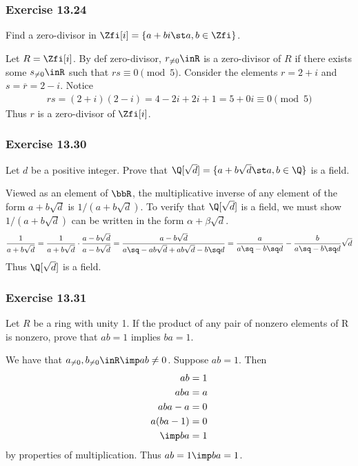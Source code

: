 \documentclass{article}
\begin{document}
\subsubsection*{Exercise 13.24}
Find a zero-divisor in \( \Zfi[i] = \{a+bi\st a,b\in\Zfi\} \).

\begin{solution} %
  Let \( R = \Zfi[i] \). By def zero-divisor, \( r_{\neq 0}\inR \) is a zero-divisor of \( R \) if there exists some \( s_{\neq 0}\inR \) such that \( rs \equiv 0 \pmod 5 \). Consider the elements \( r = 2+i \) and \( s = \overline{r} = 2-i \). Notice
  \begin{align*}
    rs = (2+i)(2-i) = 4 -2i + 2i + 1 = 5 + 0i \equiv 0 \pmod 5
  \end{align*}
  Thus \( r \) is a zero-divisor of \( \Zfi[i] \).
\end{solution}

\subsubsection*{Exercise 13.30}
Let \( d \) be a positive integer. Prove that \( \Q[\sqrt d] = \{a + b\sqrt d\st a,b\in\Q\}\) is a field.

\begin{solution} %
  Viewed as an element of \( \bbR \), the multiplicative inverse of any element of the form \( a+b\sqrt d \) is \( 1/(a+b\sqrt d) \). To verify that \( \Q[\sqrt d] \) is a field, we must show \( 1/(a+b\sqrt d) \) can be written in the form \( \alpha+\beta\sqrt d \).
  \begin{align*}
    \frac{1}{a+b\sqrt d} = \frac{1}{a+b\sqrt d} \cdot \frac{a-b\sqrt d}{a-b\sqrt d} = \frac{a-b\sqrt{d}}{a\sq -ab\sqrt{d} + ab \sqrt{d} - b\sq d} = \frac{a}{a\sq-b\sq d} - \frac{b}{a\sq-b\sq d}\sqrt{d}
  \end{align*}
  Thus \( \Q[\sqrt{d}] \) is a field.
\end{solution}

\subsubsection*{Exercise 13.31}
Let \( R \) be a ring with unity 1. If the product of any pair of nonzero elements of R is nonzero, prove that \( ab=1 \) implies \( ba=1 \).

\begin{solution} %
  We have that \( a_{\neq 0}, b_{\neq 0}\inR \imp ab \neq 0 \). Suppose \( ab = 1 \). Then \begin{align*}
    ab &= 1 \\
    aba &= a \\
    aba - a &= 0 \\
    a(ba - 1) &= 0 \\
    \imp ba &= 1
  \end{align*}
  by properties of multiplication. Thus \( ab = 1 \imp ba = 1 \).
\end{solution}
\end{document}
